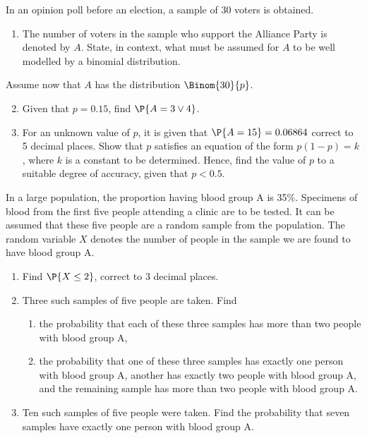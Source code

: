 \begin{problem}
    In an opinion poll before an election, a sample of 30 voters is obtained.
    \begin{enumerate}
        \item The number of voters in the sample who support the Alliance Party is denoted by $A$. State, in context, what must be assumed for $A$ to be well modelled by a binomial distribution.
    \end{enumerate}
    Assume now that $A$ has the distribution $\Binom{30}{p}$.
    \begin{enumerate}
        \setcounter{enumi}{1}
        \item Given that $p = 0.15$, find $\P{A = 3 \lor 4}$.
        \item For an unknown value of $p$, it is given that $\P{A = 15} = 0.06864$ correct to 5 decimal places. Show that $p$ satisfies an equation of the form $p(1-p)=k$, where $k$ is a constant to be determined. Hence, find the value of $p$ to a suitable degree of accuracy, given that $p<0.5$.
    \end{enumerate}
\end{problem}

\begin{problem}
    In a large population, the proportion having blood group A is 35\%. Specimens of blood from the first five people attending a clinic are to be tested. It can be assumed that these five people are a random sample from the population. The random variable $X$ denotes the number of people in the sample we are found to have blood group A.

    \begin{enumerate}
        \item Find $\P{X \leq 2}$, correct to 3 decimal places.
        \item Three such samples of five people are taken. Find
        \begin{enumerate}
            \item the probability that each of these three samples has more than two people with blood group A,
            \item the probability that one of these three samples has exactly one person with blood group A, another has exactly two people with blood group A, and the remaining sample has more than two people with blood group A.
        \end{enumerate}
        \item Ten such samples of five people were taken. Find the probability that seven samples have exactly one person with blood group A.
    \end{enumerate}
\end{problem}

